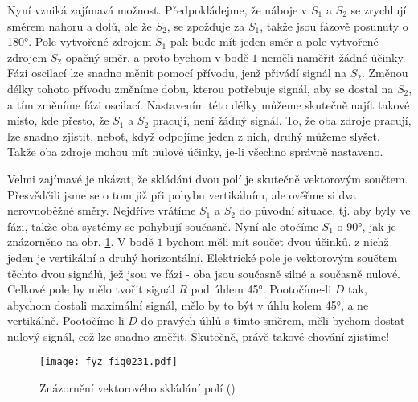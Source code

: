     Nyní vzniká zajímavá možnost. Předpokládejme, že náboje v \(S_1\) a \(S_2\) se zrychlují směrem 
    nahoru a dolů, ale že \(S_2\), se zpožďuje za \(S_1\), takže jsou fázově posunuty o \ang{180}. 
    Pole vytvořené zdrojem \(S_1\) pak bude mít jeden směr a pole vytvořené zdrojem \(S_2\) opačný 
    směr, a proto bychom v bodě \(1\) neměli naměřit žádné účinky. Fázi oscilací lze snadno měnit 
    pomocí přívodu, jenž přivádí signál na \(S_2\). Změnou délky tohoto přívodu změníme dobu, 
    kterou potřebuje signál, aby se dostal na \(S_2\), a tím změníme fázi oscilací. Nastavením této 
    délky můžeme skutečně najít takové místo, kde přesto, že \(S_1\) a \(S_2\) pracují, není žádný 
    signál. To, že oba zdroje pracují, lze snadno zjistit, neboť, když odpojíme jeden z nich, druhý 
    můžeme slyšet. Takže oba zdroje mohou mít nulové účinky, je-li všechno správně nastaveno.
    
    Velmi zajímavé je ukázat, že skládání dvou polí je skutečně vektorovým součtem. Přesvědčili 
    jsme se o tom již při pohybu vertikálním, ale ověřme si dva nerovnoběžné směry. Nejdříve 
    vrátíme \(S_1\) a \(S_2\) do původní situace, tj. aby byly ve fázi, takže oba systémy se 
    pohybují současně. Nyní ale otočíme \(S_1\) o \ang{90}, jak je znázorněno na obr. 
    \ref{fyz:fig0231}. V bodě \(1\) bychom měli mít součet dvou účinků, z nichž jeden je vertikální 
    a druhý horizontální. Elektrické pole je vektorovým součtem těchto dvou signálů, jež jsou ve 
    fázi - oba jsou současně silné a současně nulové. Celkové pole by mělo tvořit signál \(R\) pod 
    úhlem \ang{45}. Pootočíme-li \(D\) tak, abychom dostali maximální signál, mělo by to být v úhlu 
    kolem \ang{45}, a ne vertikálně. Pootočíme-li \(D\) do pravých úhlů s tímto směrem, měli bychom 
    dostat nulový signál, což lze snadno změřit. Skutečně, právě takové chování zjistíme!
    
    \begin{figure}[ht!] %
      \centering
      \texttt{[image: fyz\_fig0231.pdf]}
      \caption{Znázornění vektorového skládání polí
               (\cite[s.~377]{Feynman01})}
      \label{fyz:fig0231}
    \end{figure}
    
